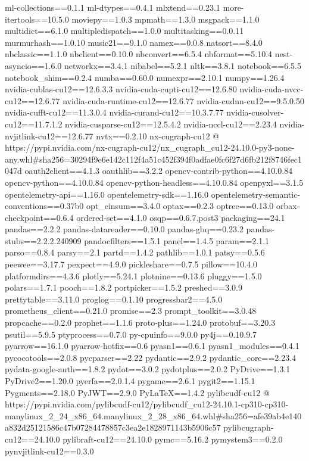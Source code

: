 ml-collections==0.1.1
ml-dtypes==0.4.1
mlxtend==0.23.1
more-itertools==10.5.0
moviepy==1.0.3
mpmath==1.3.0
msgpack==1.1.0
multidict==6.1.0
multipledispatch==1.0.0
multitasking==0.0.11
murmurhash==1.0.10
music21==9.1.0
namex==0.0.8
natsort==8.4.0
nbclassic==1.1.0
nbclient==0.10.0
nbconvert==6.5.4
nbformat==5.10.4
nest-asyncio==1.6.0
networkx==3.4.1
nibabel==5.2.1
nltk==3.8.1
notebook==6.5.5
notebook_shim==0.2.4
numba==0.60.0
numexpr==2.10.1
numpy==1.26.4
nvidia-cublas-cu12==12.6.3.3
nvidia-cuda-cupti-cu12==12.6.80
nvidia-cuda-nvcc-cu12==12.6.77
nvidia-cuda-runtime-cu12==12.6.77
nvidia-cudnn-cu12==9.5.0.50
nvidia-cufft-cu12==11.3.0.4
nvidia-curand-cu12==10.3.7.77
nvidia-cusolver-cu12==11.7.1.2
nvidia-cusparse-cu12==12.5.4.2
nvidia-nccl-cu12==2.23.4
nvidia-nvjitlink-cu12==12.6.77
nvtx==0.2.10
nx-cugraph-cu12 @ https://pypi.nvidia.com/nx-cugraph-cu12/nx_cugraph_cu12-24.10.0-py3-none-any.whl#sha256=30294f9e6e142c112f4a51c452f394f0adfae0fc6f27d6fb212f8746fec1047d
oauth2client==4.1.3
oauthlib==3.2.2
opencv-contrib-python==4.10.0.84
opencv-python==4.10.0.84
opencv-python-headless==4.10.0.84
openpyxl==3.1.5
opentelemetry-api==1.16.0
opentelemetry-sdk==1.16.0
opentelemetry-semantic-conventions==0.37b0
opt_einsum==3.4.0
optax==0.2.3
optree==0.13.0
orbax-checkpoint==0.6.4
ordered-set==4.1.0
osqp==0.6.7.post3
packaging==24.1
pandas==2.2.2
pandas-datareader==0.10.0
pandas-gbq==0.23.2
pandas-stubs==2.2.2.240909
pandocfilters==1.5.1
panel==1.4.5
param==2.1.1
parso==0.8.4
parsy==2.1
partd==1.4.2
pathlib==1.0.1
patsy==0.5.6
peewee==3.17.7
pexpect==4.9.0
pickleshare==0.7.5
pillow==10.4.0
platformdirs==4.3.6
plotly==5.24.1
plotnine==0.13.6
pluggy==1.5.0
polars==1.7.1
pooch==1.8.2
portpicker==1.5.2
preshed==3.0.9
prettytable==3.11.0
proglog==0.1.10
progressbar2==4.5.0
prometheus_client==0.21.0
promise==2.3
prompt_toolkit==3.0.48
propcache==0.2.0
prophet==1.1.6
proto-plus==1.24.0
protobuf==3.20.3
psutil==5.9.5
ptyprocess==0.7.0
py-cpuinfo==9.0.0
py4j==0.10.9.7
pyarrow==16.1.0
pyarrow-hotfix==0.6
pyasn1==0.6.1
pyasn1_modules==0.4.1
pycocotools==2.0.8
pycparser==2.22
pydantic==2.9.2
pydantic_core==2.23.4
pydata-google-auth==1.8.2
pydot==3.0.2
pydotplus==2.0.2
PyDrive==1.3.1
PyDrive2==1.20.0
pyerfa==2.0.1.4
pygame==2.6.1
pygit2==1.15.1
Pygments==2.18.0
PyJWT==2.9.0
PyLaTeX==1.4.2
pylibcudf-cu12 @ https://pypi.nvidia.com/pylibcudf-cu12/pylibcudf_cu12-24.10.1-cp310-cp310-manylinux_2_24_x86_64.manylinux_2_28_x86_64.whl#sha256=afe39ab4e140a832d25121586c47b07284478857c3ea2e1828971143b5906c57
pylibcugraph-cu12==24.10.0
pylibraft-cu12==24.10.0
pymc==5.16.2
pymystem3==0.2.0
pynvjitlink-cu12==0.3.0
